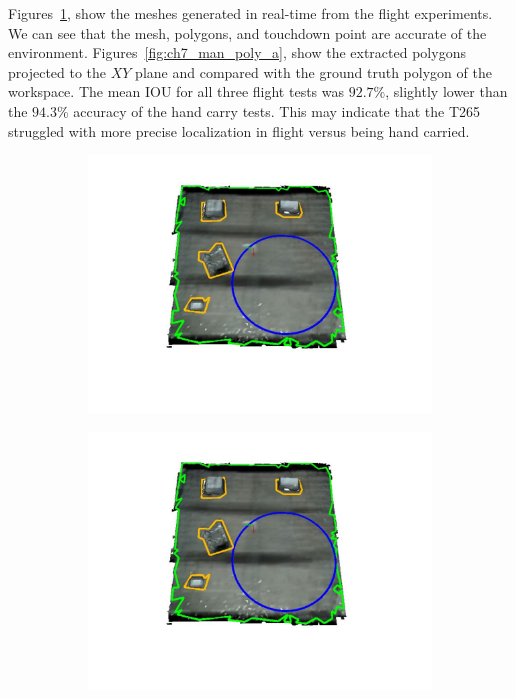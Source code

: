 Figures~\ref{fig:ch7_flight_mesh_a}, show the meshes generated in real-time from the flight experiments. We can see that the mesh, polygons, and touchdown point are accurate of the environment. Figures~\ref{fig:ch7_man_poly_a}, show the extracted polygons projected to the $XY$ plane and compared with the ground truth polygon of the workspace. The mean \ac{IOU} for all three flight tests was $92.7\%$, slightly lower than the $94.3$\% accuracy of the hand carry tests.  This may indicate that the T265 struggled with more precise localization in flight versus being hand carried. 

\begin{figure}[!htb]
  \centering
  \begin{subfigure}[t]{.29\linewidth}
    \centering  \includegraphics[page=1,clip,trim=3.5cm 3cm 3.5cm 1.0cm,width=.99\linewidth]{chapter_7_experiments/imgs/mesh_flight.pdf}
    \caption{\label{fig:ch7_flight_mesh_a}}
  \end{subfigure}
  \begin{subfigure}[t]{.29\linewidth}
    \centering  \includegraphics[page=2,clip,trim=3.5cm 3cm 3.5cm 1.0cm,width=.99\linewidth]{chapter_7_experiments/imgs/mesh_flight.pdf}

\end{subfigure}
\end{figure}
